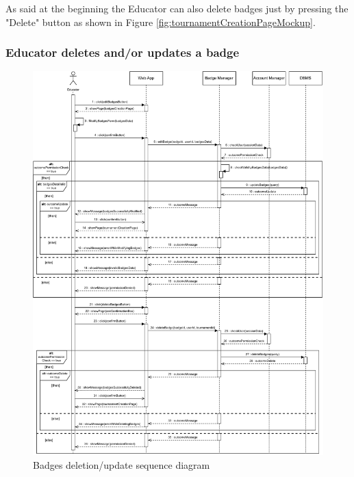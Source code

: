 \documentclass{article}
\begin{document}
{        As said at the beginning the Educator can also delete
        badges just by pressing the "Delete" button as shown in Figure
        \ref{fig:tournamentCreationPageMockup}.

    \subsubsection{Educator deletes and/or updates a badge}
        \begin{figure}[H]
            \centering
            \hspace*{-0.7cm}\includegraphics[scale=0.60]{Sequence/Sequence5DD.pdf}
            \caption{Badges deletion/update sequence diagram}
            \label{fig:Sequence5DD}
        \end{figure}
        
}
\end{document}
